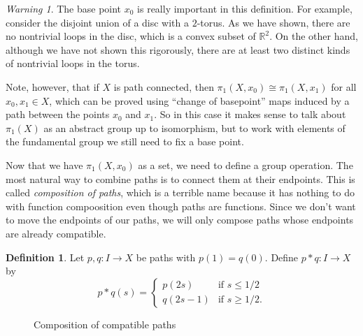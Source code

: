 \documentclass{article}
\theoremstyle{definition}
\newtheorem{defi}[thm]{Definition}
\theoremstyle{remark}
\newtheorem*{war}{Warning}
\newcommand{\R}{\mathbb R}
\numberwithin{figure}{section}
\begin{document}
\color{red}
\begin{war}
	The base point $x_0$ is really important in this definition. For example, consider the disjoint union of a disc with a $2$-torus. As we have shown, there are no nontrivial loops in the disc, which is a convex subset of $\R^2$. On the other hand, although we have not shown this rigorously, there are at least two distinct kinds of nontrivial loops in the torus.
\end{war}
\color{black}
	
Note, however, that if $X$ is path connected, then $\pi_1(X, x_0) \cong \pi_1(X, x_1)$ for all $x_0, x_1 \in X$, which can be proved using ``change of basepoint'' maps induced by a path between the points $x_0$ and $x_1$. So in this case it makes sense to talk about $\pi_1(X)$ as an abstract group up to isomorphism, but to work with elements of the fundamental group we still need to fix a base point.

Now that we have $\pi_1(X, x_0)$ as a set, we need to define a group operation. The most natural way to combine paths is to connect them at their endpoints. This is called \emph{composition of paths}, which is a terrible name because it has nothing to do with function compoosition even though paths are functions. Since we don't want to move the endpoints of our paths, we will only compose paths whose endpoints are already compatible.

\begin{defi}
	Let $p, q : I \to X$ be paths with $p(1) = q(0)$. Define $p * q : I \to X$ by
	\[
	p * q(s) = \begin{cases}
		p(2s) & \text{if } s \leq 1/2\\
		q(2s - 1) & \text{if } s \geq 1/2.
	\end{cases}
	\]
\end{defi}

\begin{figure}[h]
	\centering
	\caption{Composition of compatible paths}
	\label{fig:path composing}
\end{figure}
\end{document}
